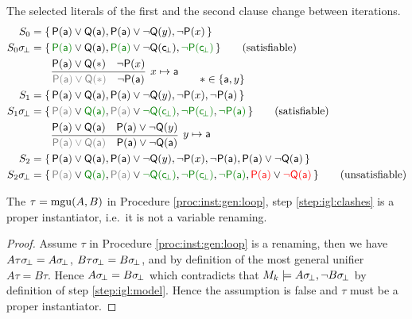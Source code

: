 \begin{example} The selected literals of the first and the second clause change between iterations.
\begin{align*}
S_0 &= \{\,
	\mP(\ma)\lor\mQ(\ma),
	\mP(\ma)\lor\lnot\mQ(y),
	\lnot\mP(x) 
\,\}
\\
S_0\subsbot &=\{\, 
	{\colHi\mP(\ma)}\lor\mQ(\ma),
	{\colHi\mP(\ma)}\lor\lnot\mQ(\consbot),
	{\colHi\lnot\mP(\consbot)} 
\,\}
\tag{satisfiable}
\\
&\qquad\infer[
	x\mapsto\ma
	]{
		{\colG \mP(\ma)\lor\mQ(\ast)}\quad\lnot\mP(\ma)
	}{
		\mP(\ma)\lor\mQ(\ast) & \lnot\mP(x)
	} 
\tag*{$\ast\in\{\ma,y\}$}
\\
S_1 &=\{\, 
	\mP(\ma)\lor\mQ(\ma),
	\mP(\ma)\lor\lnot\mQ(y),
	\lnot\mP(x),
	\lnot\mP(\ma) 
\,\}
\\
S_1\subsbot &=\{\,
	{\colG\mP(\ma)}\lor{\colHi\mQ(\ma)},
	{\colG\mP(\ma)}\lor{\colHi\lnot\mQ(\consbot)},
	{\colHi\lnot\mP(\consbot)},
	{\colHi\lnot\mP(\ma)} 
\,\}
\tag{satisfiable}
\\
&\qquad\infer[
y\mapsto\ma
]{
	{\colG \mP(\ma)\lor\mQ(\ma)}\quad\mP(\ma)\lor\lnot\mQ(\ma)
}{
	\mP(\ma)\lor\mQ(\ma) & \mP(\ma)\lor\lnot\mQ(y)
} 
\\
S_2 &=\{\, 
\mP(\ma)\lor\mQ(\ma),
\mP(\ma)\lor\lnot\mQ(y),
\lnot\mP(x),
\lnot\mP(\ma),
\mP(\ma)\lor\lnot\mQ(\ma) 
\,\}
\\
S_2\subsbot &=\{\,
{\colG\mP(\ma)}\lor{\colHi\mQ(\ma)},
{\colG\mP(\ma)}\lor{\colHi\lnot\mQ(\consbot)},
{\colHi\lnot\mP(\consbot)},
{\colHi\lnot\mP(\ma)},
{\colLo\mP(\ma)}\lor{\colLo\lnot\mQ(\ma)} 
\,\}
\tag{unsatisfiable}
\end{align*}
\end{example}

\begin{lemma}
	The $\tau = \operatorname{mgu}(A,B)$ in Procedure \ref{proc:inst:gen:loop}, 
	step \ref{step:igl:clashes} is a proper instantiator, 
	i.e.~it is not a variable renaming.
\end{lemma}
\begin{proof}
	Assume $\tau$ in Procedure \ref{proc:inst:gen:loop}
	is a renaming, then we have 
	$A\tau\sigma\!_\bot = A\sigma\!_\bot$,
	$B\tau\sigma\!_\bot = B\sigma\!_\bot$,
	and by definition of the most general unifier $A\tau = B\tau$. 
	Hence $A\sigma\!_\bot = B\sigma\!_\bot$ which contradicts that 
	$M_k\models A\sigma\!_\bot, \lnot B\sigma\!_\bot$ 
	by definition of step \ref{step:igl:model}. 
	Hence the assumption is false and $\tau$ must be a proper instantiator.
\end{proof}






